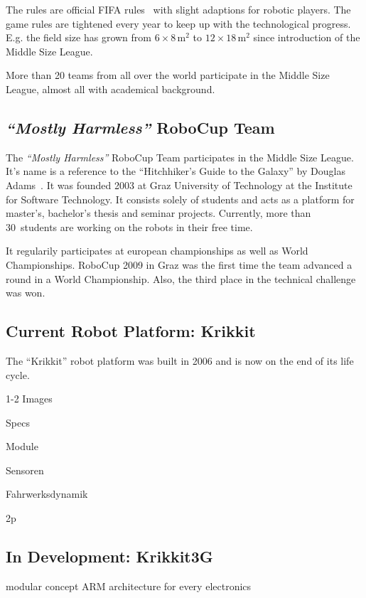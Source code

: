\documentclass[12pt,a4paper]{article}
\newcommand{\MH}{\emph{``Mostly Harmless''} RoboCup Team\xspace}
\newcommand{\MSL}{Middle Size League\xspace}
\begin{document}
The rules are official FIFA rules~\cite{msl-rules} with slight adaptions for robotic players.
The game rules are tightened every year to keep up with the technological progress. 
E.g. the field size has grown from $6\times8$\,m$^2$ to $12\times18$\,m$^2$ since introduction of the \MSL.

More than 20 teams from all over the world participate in the \MSL, almost all with academical background.


\subsection{\MH}

The \MH participates in the \MSL. 
It's name is a reference to the ``Hitchhiker's Guide to the Galaxy'' by Douglas Adams~\cite{h2g2}.
It was founded 2003 at Graz University of Technology at the Institute for Software Technology. 
It consists solely of students and acts as a platform for master's, bachelor's thesis and seminar projects.
Currently, more than 30~students are working on the robots in their free time.

It regularily participates at european championships as well as World Championships.
RoboCup 2009 in Graz was the first time the team advanced a round in a World Championship. 
Also, the third place in the technical challenge was won.




\subsection{Current Robot Platform: Krikkit}

The ``Krikkit'' robot platform was built in 2006 and is now on the end of its life cycle.


1-2 Images
  
  Specs

    Module
      
    Sensoren
    
    Fahrwerksdynamik

2p

\subsection{In Development: Krikkit3G}

    modular concept
    ARM architecture for every electronics
\end{document}
